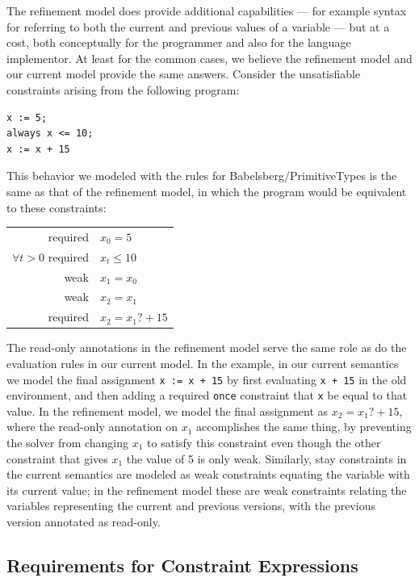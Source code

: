 The refinement model does provide additional capabilities --- for example syntax
for referring to both the current and previous values of a variable --- but at a
cost, both conceptually for the programmer and also for the language
implementor.  At least for the common cases, we believe the refinement model and
our current model provide the same answers.  Consider the unsatisfiable
constraints arising from the following program:

\begin{lstlisting}
x := 5;
always x <= 10;
x := x + 15
\end{lstlisting}

This behavior we modeled with the rules for Babelsberg/PrimitiveTypes
is the same as that of the refinement model, in which the program
would be equivalent to these constraints:

\begin{center}
  \begin{tabular}{rl}
    required & $x_0 = 5$ \\
    $\forall t>0$ required & $x_t \leq 10$\\
    weak & $x_1 = x_0$\\
    weak & $x_2 = x_1$\\
    required & $x_2 = x_1? + 15$
  \end{tabular}
\end{center}

The read-only annotations in the refinement model serve the same role
as do the evaluation rules in our current model.  In the example, in
our current semantics we model the final assignment \verb|x := x + 15| by
first evaluating \verb|x + 15| in the old environment, and then adding a
required \verb|once| constraint that \verb|x| be equal to that value.
In the refinement model, we model the final assignment as
$x_2 = x_1?  + 15$, where the read-only annotation on $x_1$
accomplishes the same thing, by preventing the solver from changing
$x_1$ to satisfy this constraint even though the other constraint that
gives $x_1$ the value of 5 is only weak.  Similarly, stay constraints
in the current semantics are modeled as weak constraints equating the
variable with its current value; in the refinement model these are weak
constraints relating the variables representing the current and
previous versions, with the previous version annotated as read-only.

\subsection{Requirements for Constraint Expressions}
\label{sec:constraint-expression-requirements} 


